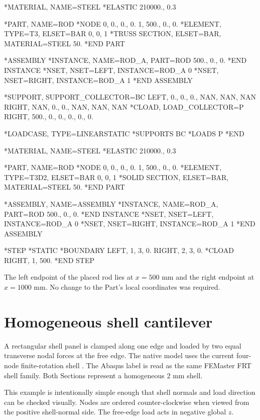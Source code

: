 \begin{dialectexamples}
\begin{femasterdeck}
*MATERIAL, NAME=STEEL
*ELASTIC
210000., 0.3

*PART, NAME=ROD
*NODE
0,   0., 0., 0.
1, 500., 0., 0.
*ELEMENT, TYPE=T3, ELSET=BAR
0, 0, 1
*TRUSS SECTION, ELSET=BAR,
 MATERIAL=STEEL
50.
*END PART

*ASSEMBLY
*INSTANCE, NAME=ROD_A, PART=ROD
500., 0., 0.
*END INSTANCE
*NSET, NSET=LEFT, INSTANCE=ROD_A
0
*NSET, NSET=RIGHT, INSTANCE=ROD_A
1
*END ASSEMBLY

*SUPPORT, SUPPORT_COLLECTOR=BC
LEFT, 0., 0., 0., NAN, NAN, NAN
RIGHT, NAN, 0., 0., NAN, NAN, NAN
*CLOAD, LOAD_COLLECTOR=P
RIGHT, 500., 0., 0., 0., 0., 0.

*LOADCASE, TYPE=LINEARSTATIC
*SUPPORTS
BC
*LOADS
P
*END
\end{femasterdeck}
\begin{abaqusdeck}
*MATERIAL, NAME=STEEL
*ELASTIC
210000., 0.3

*PART, NAME=ROD
*NODE
0,   0., 0., 0.
1, 500., 0., 0.
*ELEMENT, TYPE=T3D2, ELSET=BAR
0, 0, 1
*SOLID SECTION, ELSET=BAR,
 MATERIAL=STEEL
50.
*END PART

*ASSEMBLY, NAME=ASSEMBLY
*INSTANCE, NAME=ROD_A, PART=ROD
500., 0., 0.
*END INSTANCE
*NSET, NSET=LEFT, INSTANCE=ROD_A
0
*NSET, NSET=RIGHT, INSTANCE=ROD_A
1
*END ASSEMBLY

*STEP
*STATIC
*BOUNDARY
LEFT, 1, 3, 0.
RIGHT, 2, 3, 0.
*CLOAD
RIGHT, 1, 500.
*END STEP
\end{abaqusdeck}
\end{dialectexamples}

The left endpoint of the placed rod lies at \(x=500\) mm and the right endpoint at \(x=1000\) mm. No change to the Part's local coordinates was required.

\section{Homogeneous shell cantilever}

A rectangular shell panel is clamped along one edge and loaded by two equal transverse nodal forces at the free edge. The native model uses the current four-node finite-rotation shell . The Abaqus label  is read as the same FEMaster FRT shell family. Both Sections represent a homogeneous 2 mm shell.

This example is intentionally simple enough that shell normals and load direction can be checked visually. Nodes are ordered counter-clockwise when viewed from the positive shell-normal side. The free-edge load acts in negative global \(z\).


